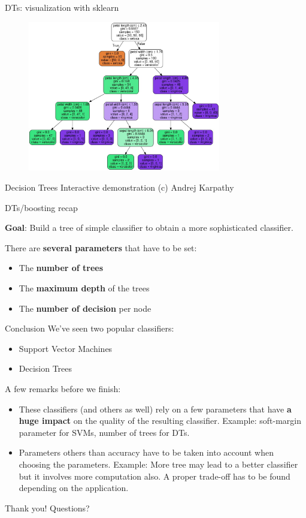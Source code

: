 \documentclass{beamer}
\begin{document}
\begin{frame}{DTs: visualization with sklearn}
\begin{figure}
\centering
\includegraphics[width=0.75\textwidth]{images/iris_tree.jpg}
\end{figure}
\end{frame}

\begin{frame}{Decision Trees}
\vfill
\Large{Interactive demonstration (c) Andrej Karpathy}
\vfill
\end{frame}

\begin{frame}{DTs/boosting recap}

\textbf{Goal}: Build a tree of simple classifier to obtain a more sophisticated classifier.

There are \textbf{several parameters} that have to be set:
\begin{itemize}
	\item The \textbf{number of trees}
	\item The \textbf{maximum depth} of the trees
	\item The \textbf{number of decision} per node
\end{itemize}

\end{frame}

\begin{frame}{Conclusion}
We've seen two popular classifiers:
\begin{itemize}
	\item Support Vector Machines
	\item Decision Trees
\end{itemize}

A few remarks before we finish:
\begin{itemize}
	\item These classifiers (and others as well) rely on a few parameters that have \textbf{a huge impact} on the quality of the resulting classifier. Example: soft-margin parameter for SVMs, number of trees for DTs. 
	\item Parameters others than accuracy have to be taken into account when choosing the parameters. Example: More tree may lead to a better classifier but it involves more computation also. A proper trade-off has to be found depending on the application.
\end{itemize}
\end{frame}

\begin{frame}
\begin{center}
\Huge{Thank you! Questions?}
\end{center}
\end{frame}
\end{document}
